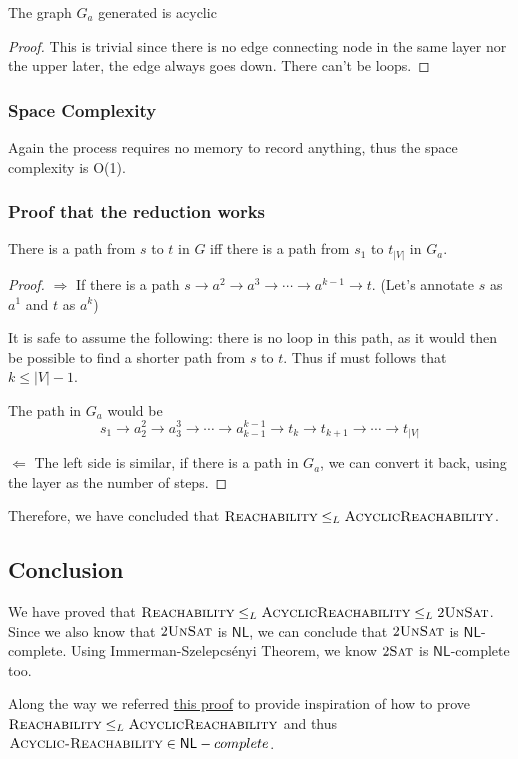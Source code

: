 \begin{theorem}
    The graph $G_a$ generated is acyclic
\end{theorem}
\begin{proof}
    This is trivial since there is no edge connecting node in the same layer nor the upper later, the edge always goes down.
    There can't be loops.
\end{proof}

\subsubsection*{Space Complexity}

Again  the process requires no memory to record anything, thus the space complexity is O(1).

\subsubsection*{Proof that the reduction works}

\begin{theorem}
    There is a path from $s$ to $t$ in $G$ iff there is a path from $s_1$ to $t_|V|$ in $G_a$.
\end{theorem}

\begin{proof}
    $\Rightarrow$ If there is a path $s \rightarrow a^2 \rightarrow a^3 \rightarrow \cdots \rightarrow a^{k-1} \rightarrow t$.
    (Let's annotate $s$ as $a^1$ and $t$ as $a^k$)

    It is safe to assume the following: there is no loop in this path, as it would then be possible to find a shorter path from $s$ to $t$.
    Thus if must follows that $k \le |V| - 1$.

    The path in $G_a$ would be $$s_1 \rightarrow a^2_2 \rightarrow a^3_3 \rightarrow \cdots \rightarrow a^{k-1}_{k-1} \rightarrow t_k \rightarrow t_{k+1} \rightarrow \cdots \rightarrow t_{|V|}$$

    $\Leftarrow$
    The left side is similar, if there is a path in $G_a$, we can convert it back, using the layer as the number of steps.
\end{proof}

Therefore, we have concluded that $\textsc{Reachability} \le_L \textsc{AcyclicReachability}$.

\subsection*{Conclusion}

We have proved that $\textsc{Reachability} \le_L \textsc{AcyclicReachability} \le_L 2\textsc{UnSat}$.
Since we also know that $2\textsc{UnSat}$ is $\mathsf{NL}$, we can conclude that $2\textsc{UnSat}$ is $\mathsf{NL}$-complete.
Using  Immerman-Szelepcs\'{e}nyi Theorem, we know  $2\textsc{Sat}$ is $\mathsf{NL}$-complete too.

Along the way we referred \href{https://people.cs.umass.edu/~barring/cs601sum03/hw/4sol.html}{this proof} to provide inspiration of how to prove $\textsc{Reachability} \le_L \textsc{AcyclicReachability}$ and thus $\textsc{Acyclic-Reachability} \in \mathsf{NL}-complete$.
